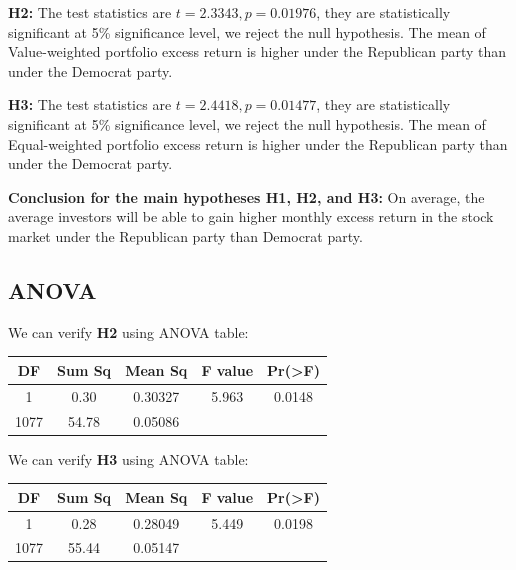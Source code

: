 \documentclass[a4paper]{article}
\begin{document}
    \textbf{H2:} The test statistics are $t = 2.3343, p = 0.01976$, they are statistically significant at 5\% significance level, we reject the null hypothesis. The mean of Value-weighted portfolio excess return is higher under the Republican party than under the Democrat party.

    \textbf{H3:} The test statistics are $t = 2.4418, p= 0.01477$, they are statistically significant at 5\% significance level, we reject the null hypothesis. The mean of Equal-weighted portfolio excess return is higher under the Republican party than under the Democrat party.

    \textbf{Conclusion for the main hypotheses H1, H2, and H3:} On average, the average investors will be able to gain higher monthly excess return in the stock market under the Republican party than Democrat party.  

\vspace{-10pt}
\subsection{ANOVA}\label{Results}
\vspace{-20pt} 
\hspace{12pt}

We can verify \textbf{H2} using ANOVA table: 
\begin{center}
\begin{tabular}{||c c c c c||} 
 \hline
 DF & Sum Sq & Mean Sq & F value & Pr(>F) \\ [0.5ex] 
 \hline\hline
 1 &  0.30  & 0.30327    & 5.963 & 0.0148  \\ 
 \hline
 1077   & 54.78  & 0.05086 & & \\
 \hline
 

\end{tabular}
\end{center}

We can verify \textbf{H3} using ANOVA table: 
\begin{center}
\begin{tabular}{||c c c c c||} 
 \hline
 DF & Sum Sq & Mean Sq & F value & Pr(>F) \\ [0.5ex] 
 \hline\hline
 1 &  0.28 & 0.28049 & 5.449 & 0.0198  \\ 
 \hline
 1077   & 55.44  & 0.05147 & & \\
 \hline
 

\end{tabular}
\end{center}
\end{document}
